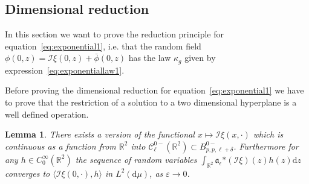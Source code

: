 \documentclass[a4paper,10pt]{article}
\newcommand{\asterisk}{\mathord{*}}
\newcommand{\mathd}{\mathrm{d}}
\newtheorem{lemma}{Lemma}
\begin{document}
\subsection{Dimensional reduction}

In this section we want to prove the reduction principle for
equation~{\eqref{eq:exponential1}}, i.e. that the random field $\phi (0, z) =
\mathcal{I} \xi (0, z) + \bar{\phi} (0, z)$ has the law $\kappa_g$ given by
expression~{\eqref{eq:exponentiallaw1}}.

Before proving the dimensional reduction for
equation~{\eqref{eq:exponential1}} we have to prove that the restriction of a
solution to a two dimensional hyperplane is a well defined operation.

\begin{lemma}
  \label{lemma_xi}There exists a version of the functional $x \longmapsto
  \mathcal{I} \xi (x, \cdot)$ which is continuous as a function from
  $\mathbb{R}^2$ into $\mathcal{C}^{0 -}_{\ell} (\mathbb{R}^2) \subset B^{0
  -}_{p, p, \ell + \delta}$. Furthermore for any $h \in C^{\infty}_0
  (\mathbb{R}^2)$ the sequence of random variables $\int_{\mathbb{R}^2}
  \mathfrak{a}_{\epsilon} \asterisk (\mathcal{I} \xi) (z) h (z) \mathd z$
  converges to $\langle \mathcal{I} \xi (0, \cdot), h \rangle$ in $L^2 (\mathd
  \mu)$, as $\varepsilon \rightarrow 0$.
\end{lemma}
\end{document}
